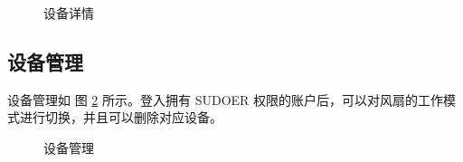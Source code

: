 \documentclass[degree=course]{sjtuthesis}
\begin{document}
\begin{figure}[htbp]
    \centering
    \hspace{1cm}
    \caption{设备详情}\label{fig:device_details}
\end{figure}

\subsection{设备管理}
设备管理如 图 \ref{fig:device_details3} 所示。登入拥有 SUDOER 权限的账户后，可以对风扇的工作模式进行切换，并且可以删除对应设备。 

\begin{figure}[htbp]
    \noindent{}
    \caption{设备管理}\label{fig:device_details3}
\end{figure}
\end{document}
